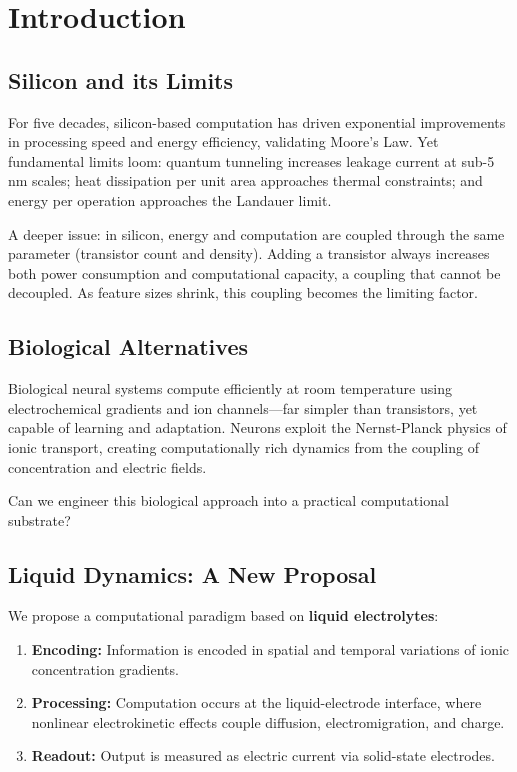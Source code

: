 \documentclass[11pt]{article}
\begin{document}
\section{Introduction}

\subsection{Silicon and its Limits}

For five decades, silicon-based computation has driven exponential improvements in processing speed and energy efficiency, validating Moore's Law. Yet fundamental limits loom: quantum tunneling increases leakage current at sub-5 nm scales; heat dissipation per unit area approaches thermal constraints; and energy per operation approaches the Landauer limit.

A deeper issue: in silicon, energy and computation are coupled through the same parameter (transistor count and density). Adding a transistor always increases both power consumption and computational capacity, a coupling that cannot be decoupled. As feature sizes shrink, this coupling becomes the limiting factor.

\subsection{Biological Alternatives}

Biological neural systems compute efficiently at room temperature using electrochemical gradients and ion channels—far simpler than transistors, yet capable of learning and adaptation. Neurons exploit the Nernst-Planck physics of ionic transport, creating computationally rich dynamics from the coupling of concentration and electric fields.

Can we engineer this biological approach into a practical computational substrate?

\subsection{Liquid Dynamics: A New Proposal}

We propose a computational paradigm based on \textbf{liquid electrolytes}:

\begin{enumerate}
\item \textbf{Encoding:} Information is encoded in spatial and temporal variations of ionic concentration gradients.
\item \textbf{Processing:} Computation occurs at the liquid-electrode interface, where nonlinear electrokinetic effects couple diffusion, electromigration, and charge.
\item \textbf{Readout:} Output is measured as electric current via solid-state electrodes.
\end{enumerate}
\end{document}
